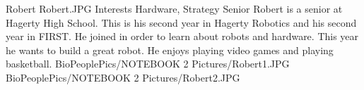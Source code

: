 \insertbio
{Robert}
{Robert.JPG}
{Interests}
{Hardware, Strategy}
{Senior}
{
Robert is a senior at Hagerty High School. This is his second year in Hagerty Robotics and his second year in FIRST. He joined in order to learn about robots and hardware. This year he wants to build a great robot. He enjoys playing video games and playing basketball.
}
{BioPeoplePics/NOTEBOOK 2 Pictures/Robert1.JPG}
{BioPeoplePics/NOTEBOOK 2 Pictures/Robert2.JPG}
